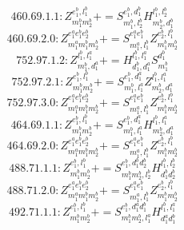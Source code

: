 \documentclass[letterpaper,10pt,fleqn,leqno,onecolumn]{article}
\begin{document}
\begin{equation} \;\;\;\;\;\;  460.69.1.1: Z^{e_{1}^{b},l_{1}^{b}}_{m_{1}^{b}m_{2}^{b}}+=S^{e_{1}^{b},d_{1}^{b}}_{m_{1}^{b},l_{2}^{b}}H^{l_{1}^{b},l_{2}^{b}}_{m_{2}^{b},d_{1}^{b}} \end{equation}
\begin{equation} \;\;\;\;\;\;  460.69.2.0: Z^{e_{1}^{a}e_{1}^{b}e_{2}^{b}}_{m_{1}^{a}m_{1}^{b}m_{2}^{b}}+=S^{e_{1}^{a}e_{1}^{b}}_{m_{1}^{a},l_{1}^{b}}Z^{e_{2}^{b},l_{1}^{b}}_{m_{1}^{b}m_{2}^{b}} \end{equation}
\begin{equation} \;\;\;\;\;\;  752.97.1.2: Z^{l_{1}^{b},l_{1}^{a}}_{m_{1}^{b},d_{1}^{a}}+=H^{l_{1}^{b},l_{1}^{a}}_{d_{1}^{b},d_{1}^{a}}S^{d_{1}^{b}}_{m_{1}^{b}} \end{equation}
\begin{equation} \;\;\;\;\;\;  752.97.2.1: Z^{e_{1}^{b},l_{1}^{b}}_{m_{1}^{b}m_{2}^{b}}+=S^{e_{1}^{b},d_{1}^{a}}_{m_{1}^{b},l_{1}^{a}}Z^{l_{1}^{b},l_{1}^{a}}_{m_{2}^{b},d_{1}^{a}} \end{equation}
\begin{equation} \;\;\;\;\;\;  752.97.3.0: Z^{e_{1}^{a}e_{1}^{b}e_{2}^{b}}_{m_{1}^{a}m_{1}^{b}m_{2}^{b}}+=S^{e_{1}^{a}e_{1}^{b}}_{m_{1}^{a},l_{1}^{b}}Z^{e_{2}^{b},l_{1}^{b}}_{m_{1}^{b}m_{2}^{b}} \end{equation}
\begin{equation} \;\;\;\;\;\;  464.69.1.1: Z^{e_{1}^{b},l_{1}^{b}}_{m_{1}^{b}m_{2}^{b}}+=S^{e_{1}^{b},d_{1}^{a}}_{m_{1}^{b},l_{1}^{a}}H^{l_{1}^{b},l_{1}^{a}}_{m_{2}^{b},d_{1}^{a}} \end{equation}
\begin{equation} \;\;\;\;\;\;  464.69.2.0: Z^{e_{1}^{a}e_{1}^{b}e_{2}^{b}}_{m_{1}^{a}m_{1}^{b}m_{2}^{b}}+=S^{e_{1}^{a}e_{1}^{b}}_{m_{1}^{a},l_{1}^{b}}Z^{e_{2}^{b},l_{1}^{b}}_{m_{1}^{b}m_{2}^{b}} \end{equation}
\begin{equation} \;\;\;\;\;\;  488.71.1.1: Z^{e_{1}^{b},l_{1}^{b}}_{m_{1}^{b}m_{2}^{b}}+=S^{e_{1}^{b},d_{1}^{b}d_{2}^{b}}_{m_{1}^{b}m_{2}^{b},l_{2}^{b}}H^{l_{1}^{b},l_{2}^{b}}_{d_{1}^{b}d_{2}^{b}} \end{equation}
\begin{equation} \;\;\;\;\;\;  488.71.2.0: Z^{e_{1}^{a}e_{1}^{b}e_{2}^{b}}_{m_{1}^{a}m_{1}^{b}m_{2}^{b}}+=S^{e_{1}^{a}e_{1}^{b}}_{m_{1}^{a},l_{1}^{b}}Z^{e_{2}^{b},l_{1}^{b}}_{m_{1}^{b}m_{2}^{b}} \end{equation}
\begin{equation} \;\;\;\;\;\;  492.71.1.1: Z^{e_{1}^{b},l_{1}^{b}}_{m_{1}^{b}m_{2}^{b}}+=S^{e_{1}^{b},d_{1}^{a}d_{1}^{b}}_{m_{1}^{b}m_{2}^{b},l_{1}^{a}}H^{l_{1}^{b},l_{1}^{a}}_{d_{1}^{a}d_{1}^{b}} \end{equation}
\end{document}

